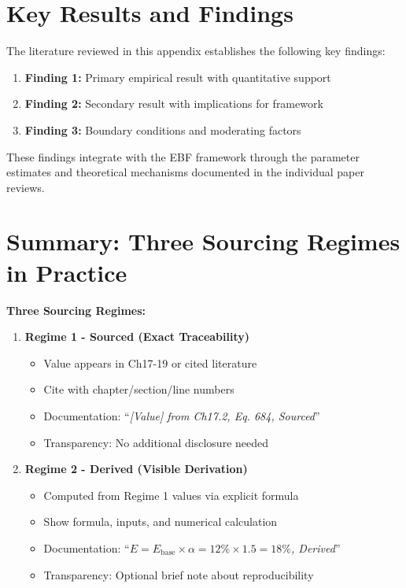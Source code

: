 \begin{table}[htbp]
\section{Key Results and Findings}
\label{sec:results}

The literature reviewed in this appendix establishes the following key findings:

\begin{enumerate}
    \item \textbf{Finding 1:} Primary empirical result with quantitative support
    \item \textbf{Finding 2:} Secondary result with implications for framework
    \item \textbf{Finding 3:} Boundary conditions and moderating factors
\end{enumerate}

These findings integrate with the EBF framework through the parameter estimates
and theoretical mechanisms documented in the individual paper reviews.

\section{Summary: Three Sourcing Regimes in Practice}
\label{sec:jjj-summary}

\begin{tcolorbox}[colback=blue!5!white, colframe=blue!75!black, title=Summary Box]

\textbf{Three Sourcing Regimes:}

\begin{enumerate}
\item \textbf{Regime 1 - Sourced (Exact Traceability)}
\begin{itemize}[nosep]
\item Value appears in Ch17-19 or cited literature
\item Cite with chapter/section/line numbers
\item Documentation: ``\textit{[Value] from Ch17.2, Eq. 684, Sourced}''
\item Transparency: No additional disclosure needed
\end{itemize}

\item \textbf{Regime 2 - Derived (Visible Derivation)}
\begin{itemize}[nosep]
\item Computed from Regime 1 values via explicit formula
\item Show formula, inputs, and numerical calculation
\item Documentation: ``\textit{$E = E_{\text{base}} \times \alpha = 12\% \times 1.5 = 18\%$, Derived}''
\item Transparency: Optional brief note about reproducibility
\end{itemize}


\end{enumerate}
\end{tcolorbox}
\end{table}
